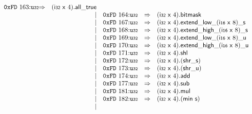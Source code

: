 $$\begin{array}{@{}l@{}rrlll@{}l@{}}
\mathtt{0xFD}~163{:}{\mathtt{u{\scriptstyle32}}} &\Rightarrow& (\mathsf{i{\scriptstyle32}}~\mathsf{x}~4) . \mathsf{all\_true} \\ &&|&
\mathtt{0xFD}~164{:}{\mathtt{u{\scriptstyle32}}} &\Rightarrow& (\mathsf{i{\scriptstyle32}}~\mathsf{x}~4).\mathsf{bitmask} \\ &&|&
\mathtt{0xFD}~167{:}{\mathtt{u{\scriptstyle32}}} &\Rightarrow& (\mathsf{i{\scriptstyle32}}~\mathsf{x}~4) . {{{{{{\mathsf{extend}}{\mathsf{\_}}}{\mathsf{low}}}{\mathsf{\_}}}{(\mathsf{i{\scriptstyle16}}~\mathsf{x}~8)}}{\mathsf{\_}}}{\mathsf{s}} \\ &&|&
\mathtt{0xFD}~168{:}{\mathtt{u{\scriptstyle32}}} &\Rightarrow& (\mathsf{i{\scriptstyle32}}~\mathsf{x}~4) . {{{{{{\mathsf{extend}}{\mathsf{\_}}}{\mathsf{high}}}{\mathsf{\_}}}{(\mathsf{i{\scriptstyle16}}~\mathsf{x}~8)}}{\mathsf{\_}}}{\mathsf{s}} \\ &&|&
\mathtt{0xFD}~169{:}{\mathtt{u{\scriptstyle32}}} &\Rightarrow& (\mathsf{i{\scriptstyle32}}~\mathsf{x}~4) . {{{{{{\mathsf{extend}}{\mathsf{\_}}}{\mathsf{low}}}{\mathsf{\_}}}{(\mathsf{i{\scriptstyle16}}~\mathsf{x}~8)}}{\mathsf{\_}}}{\mathsf{u}} \\ &&|&
\mathtt{0xFD}~170{:}{\mathtt{u{\scriptstyle32}}} &\Rightarrow& (\mathsf{i{\scriptstyle32}}~\mathsf{x}~4) . {{{{{{\mathsf{extend}}{\mathsf{\_}}}{\mathsf{high}}}{\mathsf{\_}}}{(\mathsf{i{\scriptstyle16}}~\mathsf{x}~8)}}{\mathsf{\_}}}{\mathsf{u}} \\ &&|&
\mathtt{0xFD}~171{:}{\mathtt{u{\scriptstyle32}}} &\Rightarrow& (\mathsf{i{\scriptstyle32}}~\mathsf{x}~4) . \mathsf{shl} \\ &&|&
\mathtt{0xFD}~172{:}{\mathtt{u{\scriptstyle32}}} &\Rightarrow& (\mathsf{i{\scriptstyle32}}~\mathsf{x}~4) . ({\mathsf{shr\_}}{\mathsf{s}}) \\ &&|&
\mathtt{0xFD}~173{:}{\mathtt{u{\scriptstyle32}}} &\Rightarrow& (\mathsf{i{\scriptstyle32}}~\mathsf{x}~4) . ({\mathsf{shr\_}}{\mathsf{u}}) \\ &&|&
\mathtt{0xFD}~174{:}{\mathtt{u{\scriptstyle32}}} &\Rightarrow& (\mathsf{i{\scriptstyle32}}~\mathsf{x}~4) . \mathsf{add} \\ &&|&
\mathtt{0xFD}~177{:}{\mathtt{u{\scriptstyle32}}} &\Rightarrow& (\mathsf{i{\scriptstyle32}}~\mathsf{x}~4) . \mathsf{sub} \\ &&|&
\mathtt{0xFD}~181{:}{\mathtt{u{\scriptstyle32}}} &\Rightarrow& (\mathsf{i{\scriptstyle32}}~\mathsf{x}~4) . \mathsf{mul} \\ &&|&
\mathtt{0xFD}~182{:}{\mathtt{u{\scriptstyle32}}} &\Rightarrow& (\mathsf{i{\scriptstyle32}}~\mathsf{x}~4) . (\mathsf{min}~\mathsf{s}) \\ &&|&

\end{array}$$
